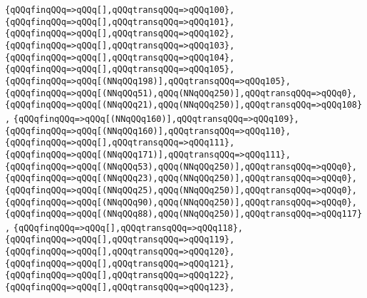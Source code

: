 \verb|{qQQqfinqQQq=>qQQq[],qQQqtransqQQq=>qQQq100},|\newline
\verb|{qQQqfinqQQq=>qQQq[],qQQqtransqQQq=>qQQq101},|\newline
\verb|{qQQqfinqQQq=>qQQq[],qQQqtransqQQq=>qQQq102},|\newline
\verb|{qQQqfinqQQq=>qQQq[],qQQqtransqQQq=>qQQq103},|\newline
\verb|{qQQqfinqQQq=>qQQq[],qQQqtransqQQq=>qQQq104},|\newline
\verb|{qQQqfinqQQq=>qQQq[],qQQqtransqQQq=>qQQq105},|\newline
\verb|{qQQqfinqQQq=>qQQq[(NNqQQq198)],qQQqtransqQQq=>qQQq105},|\newline
\verb|{qQQqfinqQQq=>qQQq[(NNqQQq51),qQQq(NNqQQq250)],qQQqtransqQQq=>qQQq0},|\newline
\verb|{qQQqfinqQQq=>qQQq[(NNqQQq21),qQQq(NNqQQq250)],qQQqtransqQQq=>qQQq108},|\newline
\verb|{qQQqfinqQQq=>qQQq[(NNqQQq160)],qQQqtransqQQq=>qQQq109},|\newline
\verb|{qQQqfinqQQq=>qQQq[(NNqQQq160)],qQQqtransqQQq=>qQQq110},|\newline
\verb|{qQQqfinqQQq=>qQQq[],qQQqtransqQQq=>qQQq111},|\newline
\verb|{qQQqfinqQQq=>qQQq[(NNqQQq171)],qQQqtransqQQq=>qQQq111},|\newline
\verb|{qQQqfinqQQq=>qQQq[(NNqQQq53),qQQq(NNqQQq250)],qQQqtransqQQq=>qQQq0},|\newline
\verb|{qQQqfinqQQq=>qQQq[(NNqQQq23),qQQq(NNqQQq250)],qQQqtransqQQq=>qQQq0},|\newline
\verb|{qQQqfinqQQq=>qQQq[(NNqQQq25),qQQq(NNqQQq250)],qQQqtransqQQq=>qQQq0},|\newline
\verb|{qQQqfinqQQq=>qQQq[(NNqQQq90),qQQq(NNqQQq250)],qQQqtransqQQq=>qQQq0},|\newline
\verb|{qQQqfinqQQq=>qQQq[(NNqQQq88),qQQq(NNqQQq250)],qQQqtransqQQq=>qQQq117},|\newline
\verb|{qQQqfinqQQq=>qQQq[],qQQqtransqQQq=>qQQq118},|\newline
\verb|{qQQqfinqQQq=>qQQq[],qQQqtransqQQq=>qQQq119},|\newline
\verb|{qQQqfinqQQq=>qQQq[],qQQqtransqQQq=>qQQq120},|\newline
\verb|{qQQqfinqQQq=>qQQq[],qQQqtransqQQq=>qQQq121},|\newline
\verb|{qQQqfinqQQq=>qQQq[],qQQqtransqQQq=>qQQq122},|\newline
\verb|{qQQqfinqQQq=>qQQq[],qQQqtransqQQq=>qQQq123},|\newline
